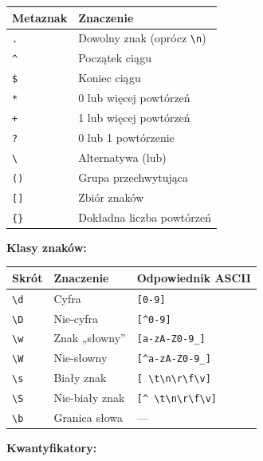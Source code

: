 \documentclass[
  polish,
  letterpaper,
  DIV=11,
  numbers=noendperiod]{scrreprt}
\newcounter{none} %
\begin{document}
{\def\LTcaptype{none} %
\begin{longtable}[]{@{}ll@{}}
\toprule\noalign{}
Metaznak & Znaczenie \\
\midrule\noalign{}
\endhead
\bottomrule\noalign{}
\endlastfoot
\texttt{.} & Dowolny znak (oprócz \texttt{\textbackslash{}n}) \\
\texttt{\^{}} & Początek ciągu \\
\texttt{\$} & Koniec ciągu \\
\texttt{*} & 0 lub więcej powtórzeń \\
\texttt{+} & 1 lub więcej powtórzeń \\
\texttt{?} & 0 lub 1 powtórzenie \\
\texttt{\textbackslash{}\textbar{}} & Alternatywa (lub) \\
\texttt{()} & Grupa przechwytująca \\
\texttt{{[}{]}} & Zbiór znaków \\
\texttt{\{\}} & Dokładna liczba powtórzeń \\
\end{longtable}
}

\textbf{Klasy znaków:}

{\def\LTcaptype{none} %
\begin{longtable}[]{@{}lll@{}}
\toprule\noalign{}
Skrót & Znaczenie & Odpowiednik ASCII \\
\midrule\noalign{}
\endhead
\bottomrule\noalign{}
\endlastfoot
\texttt{\textbackslash{}d} & Cyfra & \texttt{{[}0-9{]}} \\
\texttt{\textbackslash{}D} & Nie-cyfra & \texttt{{[}\^{}0-9{]}} \\
\texttt{\textbackslash{}w} & Znak „słowny'' &
\texttt{{[}a-zA-Z0-9\_{]}} \\
\texttt{\textbackslash{}W} & Nie-słowny &
\texttt{{[}\^{}a-zA-Z0-9\_{]}} \\
\texttt{\textbackslash{}s} & Biały znak &
\texttt{{[}\ \textbackslash{}t\textbackslash{}n\textbackslash{}r\textbackslash{}f\textbackslash{}v{]}} \\
\texttt{\textbackslash{}S} & Nie-biały znak &
\texttt{{[}\^{}\ \textbackslash{}t\textbackslash{}n\textbackslash{}r\textbackslash{}f\textbackslash{}v{]}} \\
\texttt{\textbackslash{}b} & Granica słowa & --- \\
\end{longtable}
}

\textbf{Kwantyfikatory:}
\end{document}
